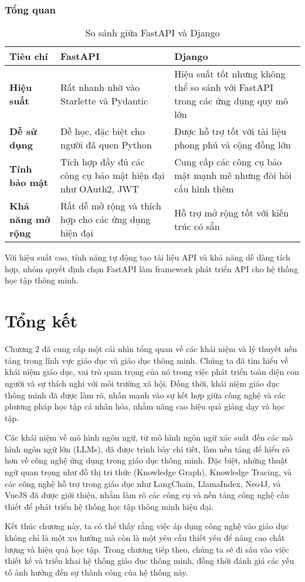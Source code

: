 \subsubsection{Tổng quan}
\begin{table}[H]
    \centering
    \begin{tabular}{|p{3cm}|p{6.5cm}|p{6.5cm}|}
    \hline
    \textbf{Tiêu chí} & \textbf{FastAPI} & \textbf{Django} \\
    \hline
    \textbf{Hiệu suất} & Rất nhanh nhờ vào Starlette và Pydantic & Hiệu suất tốt nhưng không thể so sánh với FastAPI trong các ứng dụng quy mô lớn \\
    \hline
    \textbf{Dễ sử dụng} & Dễ học, đặc biệt cho người đã quen Python & Được hỗ trợ tốt với tài liệu phong phú và cộng đồng lớn \\
    \hline
    \textbf{Tính bảo mật} & Tích hợp đầy đủ các công cụ bảo mật hiện đại như OAuth2, JWT & Cung cấp các công cụ bảo mật mạnh mẽ nhưng đòi hỏi cấu hình thêm \\
    \hline
    \textbf{Khả năng mở rộng} & Rất dễ mở rộng và thích hợp cho các ứng dụng hiện đại & Hỗ trợ mở rộng tốt với kiến trúc có sẵn \\
    \hline
    \end{tabular}
    \caption{So sánh giữa FastAPI và Django}
\end{table}
Với hiệu suất cao, tính năng tự động tạo tài liệu API và khả năng dễ dàng tích hợp, nhóm quyết định chọn FastAPI làm framework phát triển API cho hệ thống học tập thông minh.
\section{Tổng kết}
\par Chương 2 đã cung cấp một cái nhìn tổng quan về các khái niệm và lý thuyết nền tảng trong lĩnh vực giáo dục và giáo dục thông minh. Chúng ta đã tìm hiểu về khái niệm giáo dục, vai trò quan trọng của nó trong việc phát triển toàn diện con người và sự thích nghi với môi trường xã hội. Đồng thời, khái niệm giáo dục thông minh đã được làm rõ, nhấn mạnh vào sự kết hợp giữa công nghệ và các phương pháp học tập cá nhân hóa, nhằm nâng cao hiệu quả giảng dạy và học tập.

\par Các khái niệm về mô hình ngôn ngữ, từ mô hình ngôn ngữ xác suất đến các mô hình ngôn ngữ lớn (LLMs), đã được trình bày chi tiết, làm nền tảng để hiểu rõ hơn về công nghệ ứng dụng trong giáo dục thông minh. Đặc biệt, những thuật ngữ quan trọng như đồ thị tri thức (Knowledge Graph), Knowledge Tracing, và các công nghệ hỗ trợ trong giáo dục như LangChain, LlamaIndex, Neo4J, và VueJS đã được giới thiệu, nhằm làm rõ các công cụ và nền tảng công nghệ cần thiết để phát triển hệ thống học tập thông minh hiện đại.

\par Kết thúc chương này, ta có thể thấy rằng việc áp dụng công nghệ vào giáo dục không chỉ là một xu hướng mà còn là một yêu cầu thiết yếu để nâng cao chất lượng và hiệu quả học tập. Trong chương tiếp theo, chúng ta sẽ đi sâu vào việc thiết kế và triển khai hệ thống giáo dục thông minh, đồng thời đánh giá các yếu tố ảnh hưởng đến sự thành công của hệ thống này.